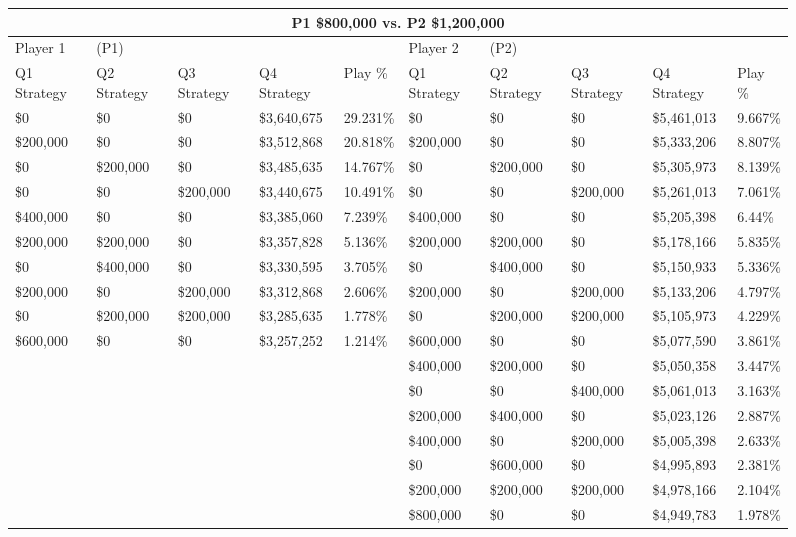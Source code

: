 \documentclass[11pt]{article}
\begin{document}
\begin{figure}
\tiny
\begin{tabular}{ |p{1.0cm}p{1.0cm}p{1.0cm}p{2.0cm}|p{1.0cm}||p{1.0cm}p{1.0cm}p{1.0cm}p{2.0cm}|p{1.0cm}|}
\hline
\multicolumn{10}{|c|}{P1 \$800,000 vs. P2 \$1,200,000} \\
\hline
Player 1 & (P1) & & & & Player 2 & (P2) & & & \\
\hline
Q1 Strategy & Q2 Strategy & Q3 Strategy & Q4 Strategy  &  Play \% & Q1 Strategy & Q2 Strategy & Q3 Strategy & Q4 Strategy  &  Play \%\\
\hline
\$0 & \$0 & \$0 & \$3,640,675 & 29.231\% & \$0 & \$0 & \$0 & \$5,461,013 & 9.667\% \\
\$200,000 & \$0 & \$0 & \$3,512,868 & 20.818\% & \$200,000 & \$0 & \$0 & \$5,333,206 & 8.807\% \\
\$0 & \$200,000 & \$0 & \$3,485,635 & 14.767\% & \$0 & \$200,000 & \$0 & \$5,305,973 & 8.139\% \\
\$0 & \$0 & \$200,000 & \$3,440,675 & 10.491\% & \$0 & \$0 & \$200,000 & \$5,261,013 & 7.061\% \\
\$400,000 & \$0 & \$0 & \$3,385,060 & 7.239\% & \$400,000 & \$0 & \$0 & \$5,205,398 & 6.44\% \\
\$200,000 & \$200,000 & \$0 & \$3,357,828 & 5.136\% & \$200,000 & \$200,000 & \$0 & \$5,178,166 & 5.835\% \\
\$0 & \$400,000 & \$0 & \$3,330,595 & 3.705\% & \$0 & \$400,000 & \$0 & \$5,150,933 & 5.336\% \\
\$200,000 & \$0 & \$200,000 & \$3,312,868 & 2.606\% & \$200,000 & \$0 & \$200,000 & \$5,133,206 & 4.797\% \\
\$0 & \$200,000 & \$200,000 & \$3,285,635 & 1.778\% & \$0 & \$200,000 & \$200,000 & \$5,105,973 & 4.229\% \\
\$600,000 & \$0 & \$0 & \$3,257,252 & 1.214\% & \$600,000 & \$0 & \$0 & \$5,077,590 & 3.861\% \\
&&&&&\$400,000 & \$200,000 & \$0 & \$5,050,358 & 3.447\% \\
&&&&&\$0 & \$0 & \$400,000 & \$5,061,013 & 3.163\% \\
&&&&&\$200,000 & \$400,000 & \$0 & \$5,023,126 & 2.887\% \\
&&&&&\$400,000 & \$0 & \$200,000 & \$5,005,398 & 2.633\% \\
&&&&&\$0 & \$600,000 & \$0 & \$4,995,893 & 2.381\% \\
&&&&&\$200,000 & \$200,000 & \$200,000 & \$4,978,166 & 2.104\% \\
&&&&&\$800,000 & \$0 & \$0 & \$4,949,783 & 1.978\% \\

\end{tabular}
\end{figure}
\end{document}
